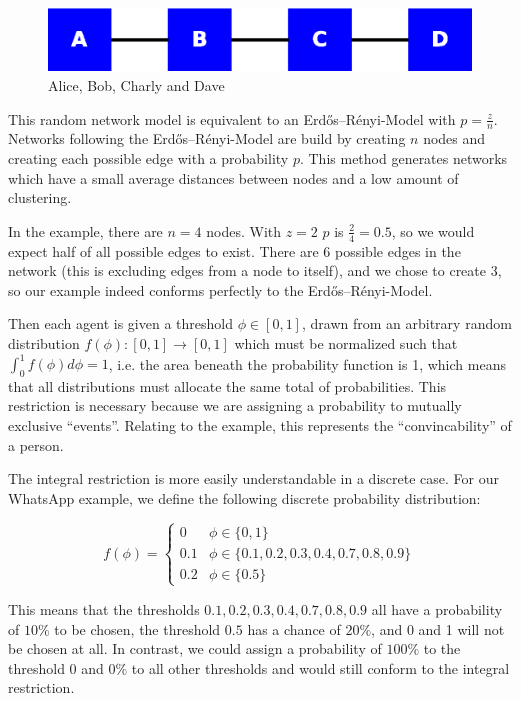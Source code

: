 \documentclass{sig-alternate-05-2015}
\begin{document}
\begin{figure}[h!]
    \includegraphics[width=\columnwidth]{img/abcd}
    \centering
    \caption{Alice, Bob, Charly and Dave}
    \label{fig:abcd}
\end{figure}

This random network model is equivalent to an Erdős–Rényi-Model with $p = \frac{z}{n}$. Networks following the Erdős–Rényi-Model are build by creating $n$ nodes and creating each possible edge with a probability $p$. This method generates networks which have a small average distances between nodes and a low amount of clustering.

In the example, there are $n = 4$ nodes. With $z = 2$ $p$ is $\frac{2}{4} = 0.5$, so we would expect half of all possible edges to exist. There are 6 possible edges in the network (this is excluding edges from a node to itself), and we chose to create 3, so our example indeed conforms perfectly to the Erdős–Rényi-Model.

Then each agent is given a threshold $\phi \in [0,1]$, drawn from an arbitrary random distribution $f(\phi): [0,1] \rightarrow [0,1]$ which must be normalized such that $\int_0^1 f(\phi) d\phi = 1$, i.e. the area beneath the probability function is 1, which means that all distributions must allocate the same total of probabilities. This restriction is necessary because we are assigning a probability to mutually exclusive ``events''. Relating to the example, this represents the ``convincability'' of a person.

The integral restriction is more easily understandable in a discrete case. For our WhatsApp example, we define the following discrete probability distribution:

$$
f(\phi) =
  \begin{cases}
    0 & \phi \in \{0, 1\} \\
    0.1 & \phi \in \{0.1, 0.2, 0.3, 0.4, 0.7, 0.8, 0.9\} \\
    0.2 & \phi \in \{0.5\}
  \end{cases}
$$

This means that the thresholds $0.1, 0.2, 0.3, 0.4, 0.7, 0.8, 0.9$ all have a probability of $10\%$ to be chosen, the threshold $0.5$ has a chance of $20\%$, and 0 and 1 will not be chosen at all. In contrast, we could assign a probability of $100\%$ to the threshold 0 and $0\%$ to all other thresholds and would still conform to the integral restriction.
\end{document}
